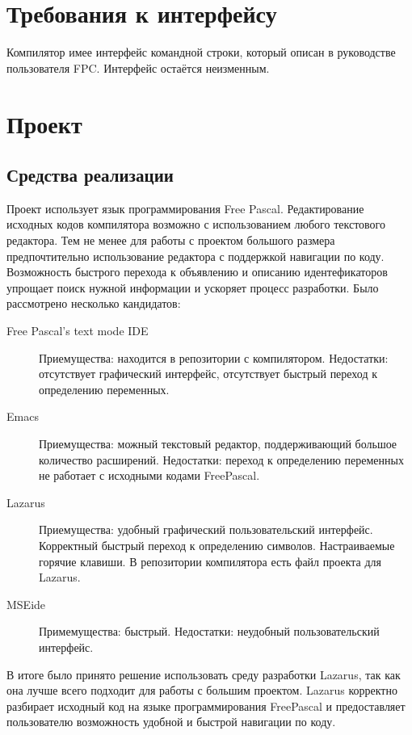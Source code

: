 \documentclass{imcs}
\begin{document}
\section{Требования к интерфейсу}

Компилятор имее интерфейс командной строки, который описан
в руководстве пользователя FPC\cite{userguide}. Интерфейс остаётся неизменным.

\section{Проект}

\subsection{Средства реализации}

Проект использует язык программирования Free Pascal. Редактирование исходных кодов
компилятора возможно с использованием любого текстового редактора. Тем не менее
для работы с проектом большого размера предпочтительно использование редактора с
поддержкой навигации по коду. Возможность быстрого перехода к объявлению и описанию
идентефикаторов упрощает поиск нужной информации и ускоряет процесс разработки.
Было рассмотрено несколько кандидатов:
\begin{description}
  \item[Free Pascal's text mode IDE] Приемущества: находится в репозитории с 
компилятором. Недостатки: отсутствует графический интерфейс, отсутствует
быстрый переход к определению переменных.
  \item[Emacs] Приемущества: можный текстовый редактор, поддерживающий большое
количество расширений. Недостатки: переход к определению переменных не работает
с исходными кодами FreePascal.
  \item[Lazarus] Приемущества: удобный графический пользовательский интерфейс.
Корректный быстрый переход к определению символов. Настраиваемые горячие клавиши.
В репозитории компилятора есть файл проекта для Lazarus.
  \item[MSEide] Примемущества: быстрый. Недостатки: неудобный 
пользовательский интерфейс.
\end{description} 
В итоге было принято решение использовать среду разработки Lazarus, так как она
лучше всего подходит для работы с большим проектом. Lazarus корректно разбирает
исходный код на языке программирования FreePascal и предоставляет пользователю
возможность удобной и быстрой навигации по коду.
\end{document}
